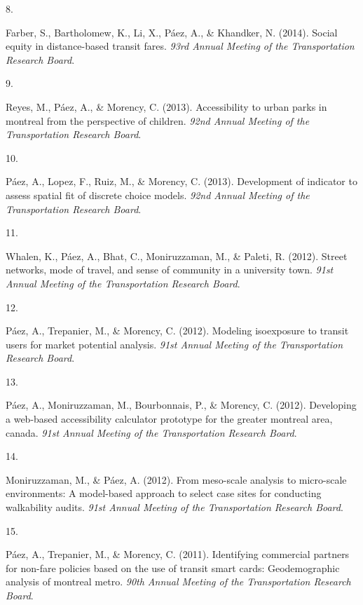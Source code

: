 \documentclass[11pt,a4paper,]{awesome-cv}
\newlength{\cslhangindent}
\newlength{\csllabelwidth}
\newenvironment{CSLReferences}[2] %
 {\begin{list}{}{%
  \setlength{\itemindent}{0pt}
  \setlength{\leftmargin}{0pt}
  \setlength{\parsep}{0pt}
  \ifodd #1
   \setlength{\leftmargin}{\cslhangindent}
   \setlength{\itemindent}{-1\cslhangindent}
  \fi
  \setlength{\itemsep}{#2\baselineskip}}}
 {\end{list}}
\newcommand{\CSLLeftMargin}[1]{\parbox[t]{\csllabelwidth}{\strut#1\strut}}
\newcommand{\CSLRightInline}[1]{\parbox[t]{\linewidth - \csllabelwidth}{\strut#1\strut}}
\begin{document}
\begin{CSLReferences}{0}{0}
\CSLLeftMargin{8. }%
\CSLRightInline{Farber, S., Bartholomew, K., Li, X., Páez, A., \&
Khandker, N. (2014). Social equity in distance-based transit fares.
\emph{93rd Annual Meeting of the Transportation Research Board}.}

\CSLLeftMargin{9. }%
\CSLRightInline{Reyes, M., Páez, A., \& Morency, C. (2013).
Accessibility to urban parks in montreal from the perspective of
children. \emph{92nd Annual Meeting of the Transportation Research
Board}.}

\CSLLeftMargin{10. }%
\CSLRightInline{Páez, A., Lopez, F., Ruiz, M., \& Morency, C. (2013).
Development of indicator to assess spatial fit of discrete choice
models. \emph{92nd Annual Meeting of the Transportation Research
Board}.}

\CSLLeftMargin{11. }%
\CSLRightInline{Whalen, K., Páez, A., Bhat, C., Moniruzzaman, M., \&
Paleti, R. (2012). Street networks, mode of travel, and sense of
community in a university town. \emph{91st Annual Meeting of the
Transportation Research Board}.}

\CSLLeftMargin{12. }%
\CSLRightInline{Páez, A., Trepanier, M., \& Morency, C. (2012). Modeling
isoexposure to transit users for market potential analysis. \emph{91st
Annual Meeting of the Transportation Research Board}.}

\CSLLeftMargin{13. }%
\CSLRightInline{Páez, A., Moniruzzaman, M., Bourbonnais, P., \& Morency,
C. (2012). Developing a web-based accessibility calculator prototype for
the greater montreal area, canada. \emph{91st Annual Meeting of the
Transportation Research Board}.}

\CSLLeftMargin{14. }%
\CSLRightInline{Moniruzzaman, M., \& Páez, A. (2012). From meso-scale
analysis to micro-scale environments: A model-based approach to select
case sites for conducting walkability audits. \emph{91st Annual Meeting
of the Transportation Research Board}.}

\CSLLeftMargin{15. }%
\CSLRightInline{Páez, A., Trepanier, M., \& Morency, C. (2011).
Identifying commercial partners for non-fare policies based on the use
of transit smart cards: Geodemographic analysis of montreal metro.
\emph{90th Annual Meeting of the Transportation Research Board}.}


\end{CSLReferences}
\end{document}
